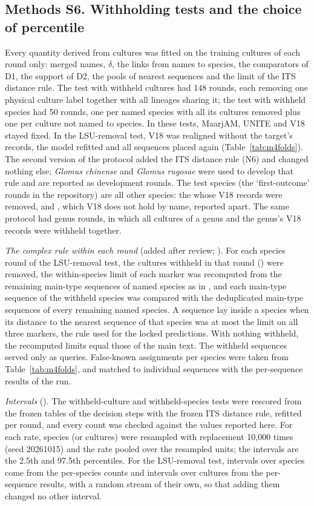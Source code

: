 \documentclass[11pt]{article}
\newcommand{\spn}[1]{\emph{#1}}   %
\begin{document}
\subsection*{Methods S6. Withholding tests and the choice of percentile}
Every quantity derived from cultures was fitted on the training cultures of each round only: merged names, $\delta$,
the links from names to species, the comparators of D1, the support of D2, the pools of nearest sequences and the
limit of the ITS distance rule. The test with withheld cultures had 148 rounds, each removing one physical culture
label together with all lineages sharing it; the test with withheld species had 50 rounds, one per named species
with all its cultures removed plus one per culture not named to species. In these tests, MaarjAM, UNITE and V18 stayed
fixed. In the LSU-removal test, V18 was realigned without the target's records, the model refitted and all sequences
placed again (Table~\ref{tab:m4folds}). The second version of the protocol added the ITS distance rule (N6) and
changed nothing else; \spn{Glomus chinense} and \spn{Glomus rugosae} were used to develop that rule and are reported
as development rounds. The test species (the `first-outcome' rounds in the repository) are all other species: the
\MfourFolds{} whose V18 records were removed, and \spn{\MfourAbsentTarget}, which V18 does not hold by name, reported
apart. The same protocol had \GenusFolds{} genus rounds, in which all cultures of a genus and the genus's V18 records
were withheld together.

\emph{The complex rule within each round} (added after review; ). For each
species round of the LSU-removal test, the cultures withheld in that round () were removed,
the within-species limit of each marker was recomputed from the remaining main-type sequences of named species as in
, and each main-type sequence of the withheld species was compared with the deduplicated
main-type sequences of every remaining named species. A sequence lay inside a species when its distance to the
nearest sequence of that species was at most the limit on all three markers, the rule used for the locked
predictions. With nothing withheld, the recomputed limits equal those of the main text. The withheld sequences served
only as queries. False-known assignments per species were taken from Table~\ref{tab:m4folds}, and matched to
individual sequences with the per-sequence results of the run.

\emph{Intervals} (). The withheld-culture and withheld-species tests were rescored from
the frozen tables of the decision steps with the frozen ITS distance rule, refitted per round, and every count was
checked against the values reported here. For each rate, species (or cultures) were resampled with replacement 10,000
times (seed 20261015) and the rate pooled over the resampled units; the intervals are the 2.5th and 97.5th
percentiles. For the LSU-removal test, intervals over species come from the per-species counts and intervals over cultures
from the per-sequence results, with a random stream of their own, so that adding them changed no other interval.
\end{document}
